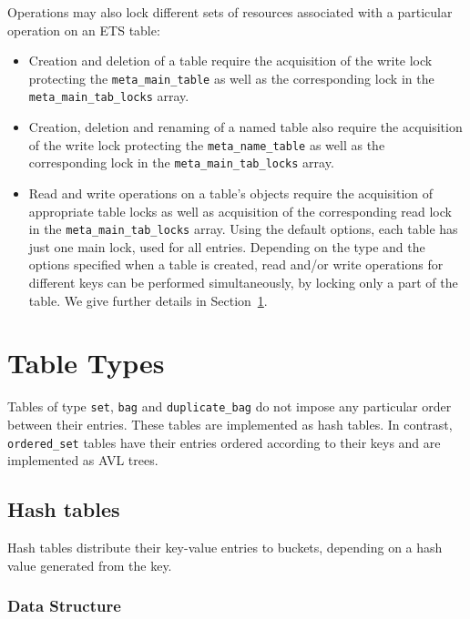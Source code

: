 \documentclass[aps,pre,preprint,nofootinbib]{revtex4}
\begin{document}
Operations may also lock different sets of resources associated with a particular operation on an ETS table:
\begin{itemize}
\item Creation and deletion of a table require the acquisition of the write lock protecting the \verb|meta_main_table| as well as the corresponding lock in the \verb|meta_main_tab_locks| array.
\item Creation, deletion and renaming of a named table also require the acquisition of the write lock protecting the \verb|meta_name_table| as well as the corresponding lock in the \verb|meta_main_tab_locks| array.
\item Read and write operations on a table's objects require the acquisition of appropriate table locks as well as acquisition of the corresponding read lock in the \verb|meta_main_tab_locks| array.
  Using the default options, each table has just one main lock, used for all entries.
  Depending on the type and the options specified when a table is created, read and/or write operations for different keys can be performed simultaneously, by locking only a part of the table.
  We give further details in Section~\ref{sec:table_types}.
\end{itemize}

\section{Table Types} \label{sec:table_types}

Tables of type \verb|set|, \verb|bag| and \verb|duplicate_bag| do not impose any particular order between their entries.
These tables are implemented as hash tables.
In contrast, \verb|ordered_set| tables have their entries ordered according to their keys and are implemented as AVL trees.

\subsection{Hash tables}

Hash tables distribute their key-value entries to buckets, depending on a hash value generated from the key.

\subsubsection{Data Structure}
\end{document}

